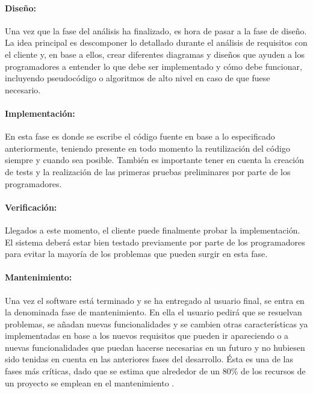 \paragraph{Diseño:}

Una vez que la fase del análisis ha finalizado, es hora de pasar a la fase de diseño. La idea principal es descomponer lo detallado durante el análisis de requisitos con el cliente y, en base a ellos, crear diferentes diagramas y diseños que ayuden a los programadores a entender lo que debe ser implementado y cómo debe funcionar, incluyendo pseudocódigo o algoritmos de alto nivel en caso de que fuese necesario.

\paragraph{Implementación:}

En esta fase es donde se escribe el código fuente en base a lo especificado anteriormente, teniendo presente en todo momento la reutilización del código siempre y cuando sea posible. También es importante tener en cuenta la creación de tests y la realización de las primeras pruebas preliminares por parte de los programadores.

\paragraph{Verificación:}

Llegados a este momento, el cliente puede finalmente probar la implementación. El sistema deberá estar bien testado previamente por parte de los programadores para evitar la mayoría de los problemas que pueden surgir en esta fase.

\paragraph{Mantenimiento:}

Una vez el software está terminado y se ha entregado al usuario final, se entra en la denominada fase de mantenimiento. En ella el usuario pedirá que se resuelvan problemas, se añadan nuevas funcionalidades y se cambien otras características ya implementadas en base a los nuevos requisitos que pueden ir  apareciendo o a nuevas funcionalidades que puedan hacerse necesarias en un futuro y no hubiesen sido tenidas en cuenta en las anteriores fases del desarrollo. Ésta es una de las fases más críticas, dado que se estima que alrededor de un 80\% de los recursos de un proyecto se emplean en el mantenimiento \cite{website:practicalsoftware}.

